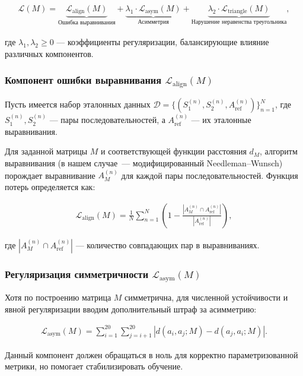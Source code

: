 \documentclass[12pt]{article}
\begin{document}
\begin{align}
\mathcal{L}(M) = \underbrace{\mathcal{L}_{\text{align}}(M)}_{\text{Ошибка выравнивания}} + 
\underbrace{\lambda_1 \cdot \mathcal{L}_{\text{asym}}(M)}_{\text{Асимметрия}} + 
\underbrace{\lambda_2 \cdot \mathcal{L}_{\text{triangle}}(M)}_{\text{Нарушение неравенства треугольника}},
\end{align}

где $\lambda_1, \lambda_2 \geq 0$ — коэффициенты регуляризации, балансирующие влияние различных компонентов.

\subsubsection{Компонент ошибки выравнивания $\mathcal{L}_{\text{align}}(M)$}

Пусть имеется набор эталонных данных $\mathcal{D} = \{(S_1^{(n)}, S_2^{(n)}, A_{\text{ref}}^{(n)})\}_{n=1}^N$, где $S_1^{(n)}, S_2^{(n)}$ — пары последовательностей, а $A_{\text{ref}}^{(n)}$ — их эталонные выравнивания.

Для заданной матрицы $M$ и соответствующей функции расстояния $d_M$, алгоритм выравнивания (в нашем случае~--- модифицированный Needleman--Wunsch) порождает выравнивание $A_M^{(n)}$ для каждой пары последовательностей. Функция потерь определяется как:

\begin{align}
\mathcal{L}_{\text{align}}(M) = \frac{1}{N} \sum_{n=1}^N \left(1 - \frac{|A_M^{(n)} \cap A_{\text{ref}}^{(n)}|}{|A_{\text{ref}}^{(n)}|}\right),
\end{align}

где $|A_M^{(n)} \cap A_{\text{ref}}^{(n)}|$ — количество совпадающих пар в выравниваниях.

\subsubsection{Регуляризация симметричности $\mathcal{L}_{\text{asym}}(M)$}

Хотя по построению матрица $M$ симметрична, для численной устойчивости и явной регуляризации вводим дополнительный штраф за асимметрию:

\begin{align}
\mathcal{L}_{\text{asym}}(M) = \sum_{i=1}^{20} \sum_{j=i+1}^{20} |d(a_i, a_j; M) - d(a_j, a_i; M)|.
\end{align}

Данный компонент должен обращаться в ноль для корректно параметризованной метрики, но помогает стабилизировать обучение.
\end{document}
